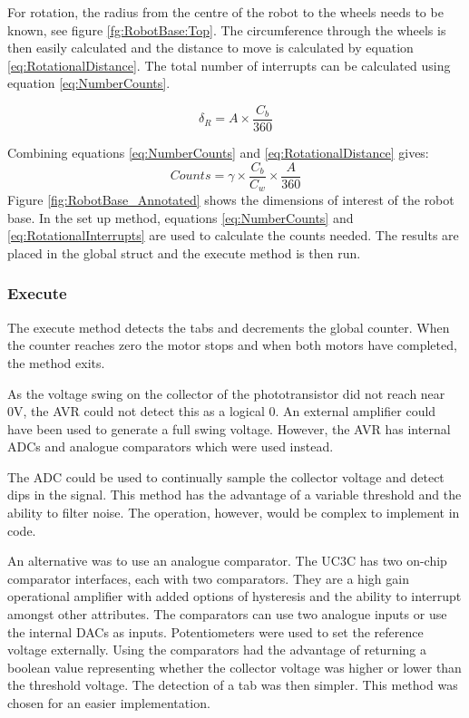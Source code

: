 For rotation, the radius from the centre of the robot to the wheels needs to be known, see figure \ref{fg:RobotBase:Top}. The circumference through the wheels is then easily calculated and the distance to move is calculated by equation \eqref{eq:RotationalDistance}. The total number of interrupts can be calculated using equation \eqref{eq:NumberCounts}. 

\begin{equation}
\label{eq:RotationalDistance}
\delta_{R} = A \times \frac{C_b}{360}
\end{equation}

Combining equations \eqref{eq:NumberCounts} and \eqref{eq:RotationalDistance} gives:
\begin{equation}
\label{eq:RotationalInterrupts}
Counts = \gamma \times \frac{C_b}{C_w} \times \frac{A}{360}
\end{equation}
Figure \ref{fig:RobotBase_Annotated} shows the dimensions of interest of the robot base. In the set up method, equations \eqref{eq:NumberCounts} and \eqref{eq:RotationalInterrupts} are used to calculate the counts needed. The results are placed in the global struct and the execute method is then run.

\subsubsection{Execute}

The execute method detects the tabs and decrements the global counter. When the counter reaches zero the motor stops and when both motors have completed, the method exits.

As the voltage swing on the collector of the phototransistor did not reach near 0V, the AVR could not detect this as a logical 0. An external amplifier could have been used to generate a full swing voltage. However, the AVR has internal ADCs and analogue comparators which were used instead. 

The ADC could be used to continually sample the collector voltage and detect dips in the signal. This method has the advantage of a variable threshold and the ability to filter noise. The operation, however, would be complex to implement in code. 

An alternative was to use an analogue comparator. The UC3C has two on-chip comparator interfaces, each with two comparators. They are a high gain operational amplifier with added options of hysteresis and the ability to interrupt amongst other attributes. The comparators can use two analogue inputs or use the internal DACs as inputs. Potentiometers were used to set the reference voltage externally. Using the comparators had the advantage of returning a boolean value representing whether the collector voltage was higher or lower than the threshold voltage. The detection of a tab was then simpler. This method was chosen for an easier implementation.

